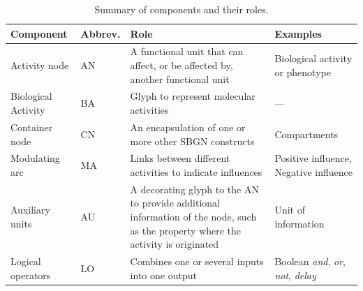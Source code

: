 \begin{table}[bh]
  \centering
  \small
  \begin{tabular}{@{}llP{2.4in}P{1.6in}@{}}
    \toprule
    \textbf{Component} & \textbf{Abbrev.} & \textbf{Role} & \textbf{Examples}\\
    \midrule
    Activity node
    & AN
    & A functional unit that can affect, or be affected by, another functional unit
    & Biological activity or phenotype \\[0.5em]

    Biological Activity
    & BA
    & Glyph to represent molecular activities
    & --- \\

    Container node	
    & CN
    & An encapsulation of one or more other SBGN constructs
    & Compartments \\[1.6em]

    Modulating arc
    & MA
    & Links between different activities to indicate influences
    & Positive influence, Negative influence \\[0.5em]
    
    Auxiliary units
    & AU
    & A decorating glyph to the AN to provide additional information of the node, such as the property where the activity is originated
    & Unit of information   \\[1.6em]
    
    Logical operators
    & LO
    & Combines one or several inputs into one output
    & Boolean \emph{and}, \emph{or}, \emph{not}, \emph{delay} \\
    \bottomrule
  \end{tabular}
  \caption{Summary of \AF components and their roles.}
  \label{tab:component-summary}
\end{table}

